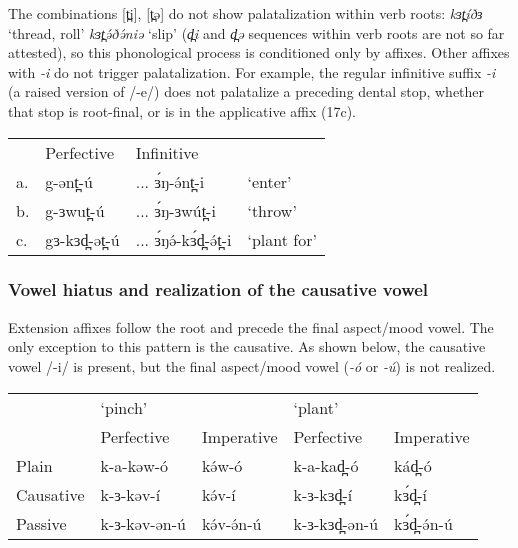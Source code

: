 The combinations [t̪i], [t̪ə] do not show palatalization within verb roots: \textit{kɜt̪íðɜ} ‘thread, roll’ \textit{kɜt̪ə́ðə́niə} ‘slip’ (\textit{d̪i} and \textit{d̪ə} sequences within verb roots are not so far attested), so this phonological process is conditioned only by affixes. Other affixes with \textit{-i} do not trigger palatalization. For example, the regular infinitive suffix \textit{-i} (a raised version of /-e/) does not palatalize a preceding dental stop, whether that stop is root-final, or is in the applicative affix (17c). 

\ea \begin{tabular}[t]{llll}
	   &     	Perfective	& 	Infinitive 	 & 		\\
a. & 	g-ənt̪-ú				& 	... ɜ́ŋ-ə́nt̪-i & 		‘enter’ \\
b. & 	g-ɜwut̪-ú			& ... ɜ́ŋ-ɜwút̪-i	 & 	‘throw’ \\
c.	& gɜ-kɜd̪-ət̪-ú			& ... ɜ́ŋə́-kɜ́d̪-ə́t̪-i	& 	‘plant for’\\
 	 \end{tabular}
	       	\z 

% 


\subsubsection{Vowel hiatus and realization of the causative vowel}

Extension affixes follow the root and precede the final aspect/mood vowel. The only exception to this pattern is the causative. As shown below, the causative vowel /-i/ is present, but the final aspect/mood vowel (\textit{-ó} or \textit{-ú}) is not realized.

\ea
\begin{tabular}[t]{lllll}
& 	         	‘pinch’		&			&	‘plant’\\
&		Perfective	& Imperative			&	Perfective&	Imperative\\
Plain		&	k-a-kəw-ó	&	kə́w-ó	&	k-a-kad̪-ó	&	kád̪-ó\\
Causative  	&   k-ɜ-kəv-í	&	kə́v-í	&	k-ɜ-kɜd̪-í	&	kɜ́d̪-í\\
Passive		&	k-ɜ-kəv-ən-ú&	kə́v-ə́n-ú	&	k-ɜ-kɜd̪-ən-ú& 	kɜ́d̪-ə́n-ú\\
\end{tabular}
\z 

